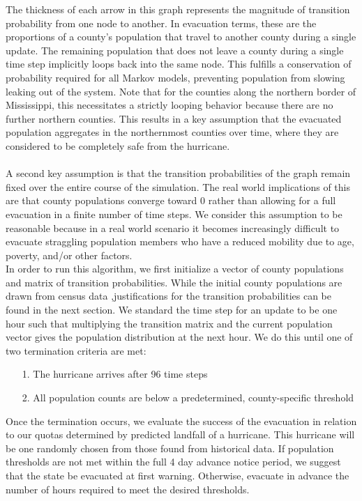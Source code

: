 \documentclass[titlepage]{article}
\begin{document}
    The thickness of each arrow in this graph represents the magnitude of transition probability from one node to another. In evacuation terms, these are the proportions of a county's population that travel to another county during a single update. The remaining population that does not leave a county during a single time step implicitly loops back into the same node. This fulfills a conservation of probability required for all Markov models, preventing population from slowing leaking out of the system. Note that for the counties along the northern border of Mississippi, this necessitates a strictly looping behavior because there are no further northern counties. This results in a key assumption that the evacuated population aggregates in the northernmost counties over time, where they are considered to be completely safe from the hurricane. \\
    \\
    A second key assumption is that the transition probabilities of the graph remain fixed over the entire course of the simulation. The real world implications of this are that county populations converge toward 0 rather than allowing for a full evacuation in a finite number of time steps. We consider this assumption to be reasonable because in a real world scenario it becomes increasingly difficult to evacuate straggling population members who have a reduced mobility due to age, poverty, and/or other factors. \\

    In order to run this algorithm, we first initialize a vector of county populations and matrix of transition probabilities. While the initial county populations are drawn from census data \cite{census},justifications for the transition probabilities can be found in the next section. We standard the time step for an update to be one hour such that multiplying the transition matrix and the current population vector gives the population distribution at the next hour. We do this until one of two termination criteria are met:
    \begin{itemize}
      \item[1.]
        The hurricane arrives after 96 time steps
      \item[2.]
        All population counts are below a predetermined, county-specific threshold
    \end{itemize}

    Once the termination occurs, we evaluate the success of the evacuation in relation to our quotas determined by predicted landfall of a hurricane. This hurricane will be one randomly chosen from those found from historical data. If population thresholds are not met within the full 4 day advance notice period, we suggest that the state be evacuated at first warning. Otherwise, evacuate in advance the number of hours required to meet the desired thresholds.
\end{document}

